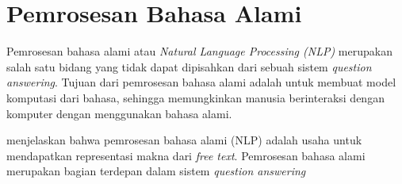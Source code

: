 \section{Pemrosesan Bahasa Alami}
Pemrosesan bahasa alami atau \emph{Natural Language Processing (NLP)} merupakan salah satu bidang yang tidak dapat dipisahkan dari sebuah sistem \emph{question answering}. Tujuan dari pemrosesan bahasa alami adalah untuk membuat model komputasi dari bahasa, sehingga memungkinkan manusia berinteraksi dengan komputer dengan menggunakan bahasa alami.

\citet*{kao_potet} menjelaskan bahwa pemrosesan bahasa alami (NLP) adalah usaha untuk mendapatkan representasi makna dari \emph{free text}. Pemrosesan bahasa alami merupakan bagian terdepan dalam sistem \emph{question answering}

